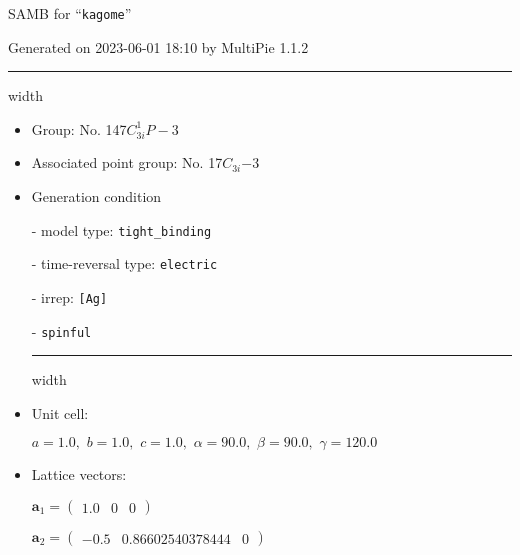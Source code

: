 \documentclass[fleqn,10pt,landscape]{article}
\begin{document}
\setcounter{MaxMatrixCols}{16}

\setlength{\baselineskip}{16pt}
\footnotesize
\begin{center}
\LARGE
SAMB for ``\texttt{kagome}''
\end{center}
\begin{flushright}
Generated on 2023-06-01 18:10 by MultiPie 1.1.2
\end{flushright}
\vspace{1cm}


 \hfil \hrule height 1mm width \textwidth \hfil

\begin{itemize}
\item Group: No. 147\quad$C_{3i}^{1}$\quad$P-3$\quad[ trigonal ]

\item Associated point group: No. 17\quad$C_{3i}$\quad$-3$\quad[ trigonal ]

\vspace{5mm}

\item Generation condition

\quad - model type: \texttt{tight_binding}

\quad - time-reversal type: \texttt{electric}

\quad - irrep: \texttt{[Ag]}

\quad - \texttt{spinful}


 \hfil \hrule height 1mm width \textwidth \hfil

\item Unit cell:

\quad $a=1.0,\,\, b=1.0,\,\, c=1.0,\,\, \alpha=90.0,\,\, \beta=90.0,\,\, \gamma=120.0$

\item Lattice vectors:

\quad $\bm{a}_1=\begin{pmatrix} 1.0 & 0 & 0 \end{pmatrix}$

\quad $\bm{a}_2=\begin{pmatrix} -0.5 & 0.86602540378444 & 0 \end{pmatrix}$


\end{itemize}
\end{document}
